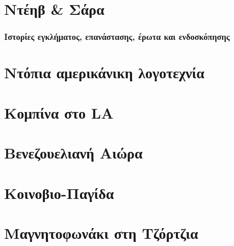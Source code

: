 \documentclass[12pt]{book}
\begin{document}
\setlength{\hsize}{0.85\hsize}
\justifying

\frontmatter
{}

\chapter*{\Huge \center Ντέηβ \& Σάρα }
\subsection*{\Huge \center Ιστορίες εγκλήματος, επανάστασης, έρωτα και ενδοσκόπησης}
\newpage

\thispagestyle{empty}

\chapter*{\center \normalsize Ντόπια αμερικάνικη λογοτεχνία}

\setcounter{tocdepth}{1}
\renewcommand*\contentsname{Περιεχόμενα}
\tableofcontents

\mainmatter
\renewcommand{\labelenumii}{\arabic{enumi}.\arabic{}{enumii}}
\setcounter{page}{6}


\chapter{Κομπίνα στο LA}


\chapter{Βενεζουελιανή Αιώρα}


\chapter{Κοινοβιο-Παγίδα}


\chapter{Μαγνητοφωνάκι στη Τζόρτζια}

\end{document}
